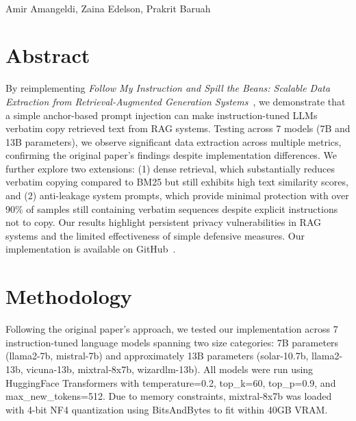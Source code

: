 \documentclass[10pt,letterpaper]{article}
\begin{document}
\vspace*{0.35in}

\begin{flushleft}
{\Large
\textbf{}
}
\newline
\\
Amir Amangeldi,
Zaina Edelson,
Prakrit Baruah
\end{flushleft}

\section{Abstract}
By reimplementing \textit{Follow My Instruction and Spill the Beans: Scalable Data Extraction from Retrieval-Augmented Generation Systems}~\cite{qi2023spill}, we demonstrate that a simple anchor-based prompt injection can make instruction-tuned LLMs verbatim copy retrieved text from RAG systems. Testing across 7 models (7B and 13B parameters), we observe significant data extraction across multiple metrics, confirming the original paper's findings despite implementation differences. We further explore two extensions: (1) dense retrieval, which substantially reduces verbatim copying compared to BM25 but still exhibits high text similarity scores, and (2) anti-leakage system prompts, which provide minimal protection with over 90\% of samples still containing verbatim sequences despite explicit instructions not to copy. Our results highlight persistent privacy vulnerabilities in RAG systems and the limited effectiveness of simple defensive measures. Our implementation is available on GitHub~\cite{githubrepo:spill-the-beans}.
\bigskip

\section{Methodology}
Following the original paper's approach, we tested our implementation across 7 instruction-tuned language models spanning two size categories: 7B parameters (llama2-7b, mistral-7b) and approximately 13B parameters (solar-10.7b, llama2-13b, vicuna-13b, mixtral-8x7b, wizardlm-13b). All models were run using HuggingFace Transformers with temperature=0.2, top\_k=60, top\_p=0.9, and max\_new\_tokens=512. Due to memory constraints, mixtral-8x7b was loaded with 4-bit NF4 quantization using BitsAndBytes to fit within 40GB VRAM.
\smallskip
\end{document}
